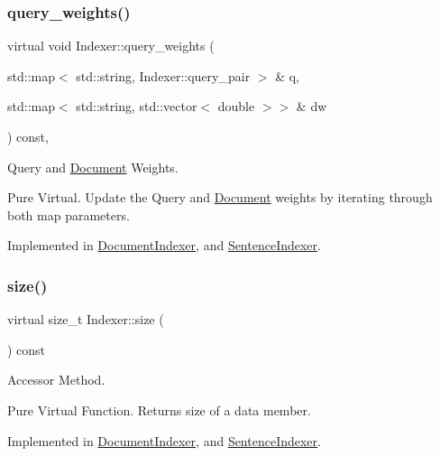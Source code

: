 \subsubsection{\texorpdfstring{query\+\_\+weights()}{query\_weights()}}
{\footnotesize\ttfamily virtual void Indexer\+::query\+\_\+weights (\begin{DoxyParamCaption}\item[{std\+::map$<$ std\+::string, Indexer\+::query\+\_\+pair $>$ \&}]{q,  }\item[{std\+::map$<$ std\+::string, std\+::vector$<$ double $>$$>$ \&}]{dw }\end{DoxyParamCaption}) const\hspace{0.3cm}{\ttfamily [protected]}, {}}



Query and \hyperlink{class_document}{Document} Weights. 

Pure Virtual. Update the Query and \hyperlink{class_document}{Document} weights by iterating through both map parameters. 

Implemented in \hyperlink{class_document_indexer_ad9a1b17fec1c999e98b58e3433727f05}{Document\+Indexer}, and \hyperlink{class_sentence_indexer_ad3835aaf2ff4a59fff85d596dfc95d5c}{Sentence\+Indexer}.

\mbox{\label{class_indexer_ab8b3e17bbf16d54e1e773a1630abb138}} 
\subsubsection{\texorpdfstring{size()}{size()}}
{\footnotesize\ttfamily virtual size\+\_\+t Indexer\+::size (\begin{DoxyParamCaption}{ }\end{DoxyParamCaption}) const\hspace{0.3cm}{\ttfamily [pure virtual]}}



Accessor Method. 

Pure Virtual Function. Returns size of a data member. 

Implemented in \hyperlink{class_document_indexer_a0c5ab06e1506acc9bbc950e5c563e278}{Document\+Indexer}, and \hyperlink{class_sentence_indexer_a47409c62e1607ae3919a77080fe240a0}{Sentence\+Indexer}.

\mbox{\label{class_indexer_a96e17172c76abb679e7cd2ff4606ce4a}} 
